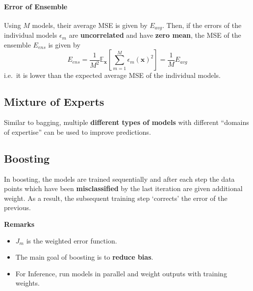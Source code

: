 \paragraph{Error of Ensemble}
Using $M$ models, their average MSE is given by $E_{avg}$.
Then, if the errors of the individual models $\epsilon_m$ are \textbf{uncorrelated} and have \textbf{zero mean}, the MSE of the ensemble $E_{ens}$ is given by
\noindent\begin{equation*}
    E_{ens} = \frac{1}{M^2}\mathbb{E}_{\mathbf{x}} \left[\sum_{m=1}^{M} {\epsilon_m(\mathbf{x})}^2\right] = \frac{1}{M} E_{avg}
\end{equation*}
i.e.\ it is lower than the expected average MSE of the individual models.

\subsection{Mixture of Experts}
Similar to bagging, multiple \textbf{different types of models} with different ``domains of expertise'' can be used to improve predictions.

\subsection{Boosting}
In boosting, the models are trained sequentially and after each step the data points which have been \textbf{misclassified} by the last iteration are given additional weight.
As a result, the subsequent training step `corrects' the error of the previous.

\newpar{}

\textbf{Remarks}
\begin{itemize}
    \item $J_m$ is the weighted error function.
    \item The main goal of boosting is to \textbf{reduce bias}.
    \item For Inference, run models in parallel and weight outputs with training weights.
\end{itemize}